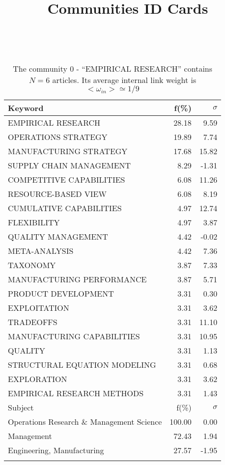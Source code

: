 \documentclass[a4paper,11pt]{report}
\title{{\bf Communities ID Cards}}
\date{\begin{flushleft}This document gather the ``ID Cards'' of the CC communities found within your database.\\
 The CC network was built by keeping a link between articles sharing at least 10 references. The communities characterized here correspond to the ones found in the level 0 (in the sense of the Louvain algo) which gathers more than 0 articles.\\
 These ID cards displays the most frequent keywords, subject categories, journals of publication, institution, countries, authors, references and reference journals of the articles of each community. The significance of an item $\sigma = \sqrt{N} (f - p) / \sqrt{p(1-p)}$ [where $N$ is the number of articles within the community and $f$ and $p$ are the proportion of articles respectively within the community and within the database displaying that item ] is also given (for example $\sigma > 5$ is really highly significant).\\
\vspace{1cm}
\copyright Sebastian Grauwin, Liu Weizhi - (2014) \end{flushleft}}
\begin{document}
\begin{landscape}
\maketitle
\clearpage

\begin{table}[!ht]
\caption{The community 0 - ``EMPIRICAL RESEARCH'' contains $N = 6$ articles. Its average internal link weight is $<\omega_{in}> \simeq 1/9$ }
\textcolor{white}{aa}\\
{\scriptsize\begin{tabular}{|l r r|}
\hline
Keyword & f(\%) & $\sigma$\\
\hline
EMPIRICAL RESEARCH & 28.18 & 9.59\\
OPERATIONS STRATEGY & 19.89 & 7.74\\
MANUFACTURING STRATEGY & 17.68 & 15.82\\
SUPPLY CHAIN MANAGEMENT & 8.29 & -1.31\\
COMPETITIVE CAPABILITIES & 6.08 & 11.26\\
RESOURCE-BASED VIEW & 6.08 & 8.19\\
CUMULATIVE CAPABILITIES & 4.97 & 12.74\\
FLEXIBILITY & 4.97 & 3.87\\
QUALITY MANAGEMENT & 4.42 & -0.02\\
META-ANALYSIS & 4.42 & 7.36\\
TAXONOMY & 3.87 & 7.33\\
MANUFACTURING PERFORMANCE & 3.87 & 5.71\\
PRODUCT DEVELOPMENT & 3.31 & 0.30\\
EXPLOITATION & 3.31 & 3.62\\
TRADEOFFS & 3.31 & 11.10\\
MANUFACTURING CAPABILITIES & 3.31 & 10.95\\
QUALITY & 3.31 & 1.13\\
STRUCTURAL EQUATION MODELING & 3.31 & 0.68\\
EXPLORATION & 3.31 & 3.62\\
EMPIRICAL RESEARCH METHODS & 3.31 & 1.43\\
\hline
\hline
Subject & f(\%) & $\sigma$\\
\hline
Operations Research \& Management Science & 100.00 & 0.00\\
Management & 72.43 & 1.94\\
Engineering, Manufacturing & 27.57 & -1.95\\
 &  & \\

\end{tabular}}
\end{table}
\end{landscape}
\end{document}
